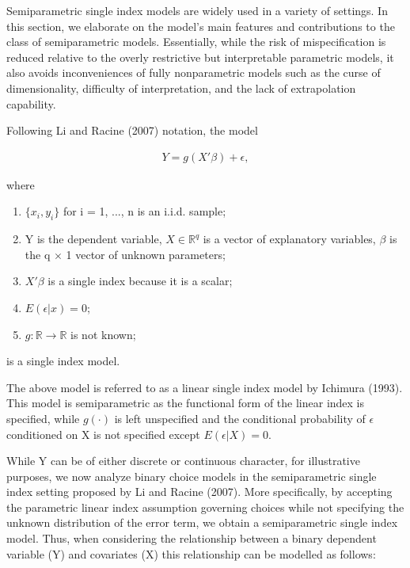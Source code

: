 \documentclass[a4paper]{article}
\begin{document}
Semiparametric single index models are widely used in a variety of settings.
In this section, we elaborate on the model's main features and contributions to the class of semiparametric models.  
Essentially, while the risk of mispecification is reduced relative to the overly restrictive but interpretable parametric models, it also avoids inconveniences of fully nonparametric models such as the curse of dimensionality, difficulty of interpretation, and the lack of extrapolation capability.

\vspace{2mm} 
Following Li and Racine (2007) notation, the model
 
\begin{eqnarray}
Y = g(X'\beta) + \epsilon,  %
\end{eqnarray}

where

\begin{enumerate}[label=(\roman*)]
		\item $\{x_i,y_i\}$ for i = 1, ..., n is an i.i.d. sample;
		\item Y is the dependent variable, $X\in \mathbb{R}^{q}$ is a vector of explanatory variables, $\beta$ is the q $\times$ 1 vector of unknown parameters; 
	\item $X'\beta$ is a single index because it is a scalar;
	\item $ E(\epsilon|x) = 0 $;
	\item $g: \mathbb{R} \rightarrow \mathbb{R} $ is not known; %
\end{enumerate}

is a single index model.
\vspace{2mm}

The above model is referred to as a linear single index model by Ichimura (1993). This model is semiparametric as the functional form of the linear index is specified, while $g(\cdot)$ is left unspecified and the conditional probability of $\epsilon$ conditioned on X is not specified except $ E(\epsilon|X) = 0 $. 

While Y can be of either discrete or continuous character, for illustrative purposes, we now analyze binary choice models in the semiparametric single index setting proposed by Li and Racine (2007). More specifically, by accepting the parametric linear index assumption governing choices while not specifying the unknown distribution of the error term, we obtain a semiparametric single index model. Thus, when considering the relationship between a binary dependent variable (Y) and covariates (X) this relationship can be modelled as follows:
\end{document}
